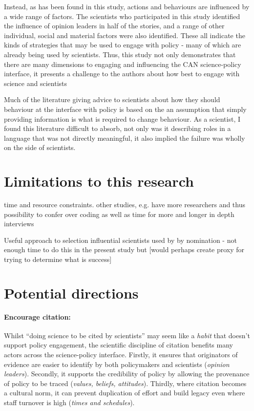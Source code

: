 Instead, as has been found in this study, actions and behaviours are influenced by a wide range of factors. The scientists who participated in this study identified the influence of opinion leaders in half of the stories, and a range of other individual, social and material factors were also identified. These all indicate the kinds of strategies that may be used to engage with policy - many of which are already being used by scientists. Thus, this study not only demonstrates that there are many dimensions to engaging and influencing the CAN science-policy interface, it presents a challenge to the authors about how best to engage with science and scientists

Much of the literature giving advice to scientists about how they should behaviour at the interface with policy is based on the an assumption that simply providing information is what is required to change behaviour. As a scientist, I found this literature difficult to absorb, not only was it describing roles in a language that was not directly meaningful, it also implied the failure was wholly on the side of scientists. 

\section{Limitations to this research}
time and resource constraints. other studies, e.g. \cite{HaynesDCRHGS2011,OjanenBKP2021} have more researchers and thus possibility to confer over coding as well as time for more and longer in depth interviews

Useful approach to selection influential scientists used by \textcite{HaynesDCRHGS2011} by nomination - not enough time to do this in the present study but [would perhaps create proxy for trying to determine what is success]

\section{Potential directions}

\paragraph{Encourage citation:}

Whilst ``doing science to be cited by scientists'' may seem like a \emph{habit} that doesn't support policy engagement, the scientific discipline of citation benefits many actors across the science-policy interface. Firstly, it ensures that originators of evidence are easier to identify by both policymakers and scientists (\emph{opinion leaders}). Secondly, it supports the credibility of policy by allowing the provenance of policy to be traced (\emph{values, beliefs, attitudes}). Thirdly, where citation becomes a cultural norm, it can prevent duplication of effort and build legacy even where staff turnover is high (\emph{times and schedules}).

